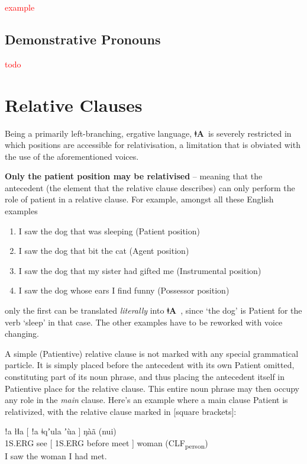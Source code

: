 \documentclass[11pt]{book}
\newcommand{\qcn}[1]{\textbf{#1}}
\newcommand{\langname}{\qcn{ǂA}~}
\newcommand{\grammsc}[1]{\textsc{#1}}
\newcommand{\CLF}[1]{\grammsc{CLF}\textsubscript{#1}}
\newcommand{\ERG}{\grammsc{ERG}}
\newcommand{\cmnt}[1]{\textcolor{red}{#1}}
\begin{document}
\cmnt{example}

\subsection{Demonstrative Pronouns}

\cmnt{todo}

\section{Relative Clauses}\label{sec:relative}

Being a primarily left-branching, ergative language, \langname is severely restricted in which positions are accessible for relativisation, a limitation that is obviated with the use of the aforementioned voices.

\textbf{Only the patient position may be relativised} -- meaning that the antecedent (the element that the relative clause describes) can only perform the role of patient in a relative clause. For example, amongst all these English examples

\begin{enumerate}
\item I saw the dog that was sleeping (Patient position)
\item I saw the dog that bit the cat (Agent position)
\item I saw the dog that my sister had gifted me (Instrumental position)
\item I saw the dog whose ears I find funny (Possessor position)
\end{enumerate}

only the first can be translated \emph{literally} into \langname, since `the dog' is Patient for the verb `sleep' in that case. The other examples have to be reworked with voice changing.

A simple (Patientive) relative clause is not marked with any special grammatical particle. It is simply placed before the antecedent with its own Patient omitted, constituting part of its noun phrase, and thus placing the antecedent itself in Patientive place for the relative clause. This entire noun phrase may then occupy any role in the \emph{main} clause. Here's an example where a main clause Patient is relativized, with the relative clause marked in [square brackets]:

\begin{exe}
\ex
\gll ǃa łǁa [ ǃa ǂqʼula ʼùa ] ŋàã (nui) \\
1S.\ERG{} see [ 1S.\ERG{} before meet ] woman (\CLF{person}) \\
\glt I saw the woman I had met.
\end{exe}
\end{document}
